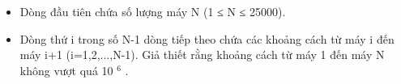\begin{itemize}
	\item     Dòng đầu tiên chứa số lượng máy N (1 ≤ N ≤ 25000).   
	\item     Dòng thứ i trong số N-1 dòng tiếp theo chứa các khoảng cách từ máy i đến máy i+1 (i=1,2,...,N-1). Giả thiết rằng khoảng cách từ máy 1 đến máy N không vượt quá 10    $^     6    $    .   
\end{itemize}

\